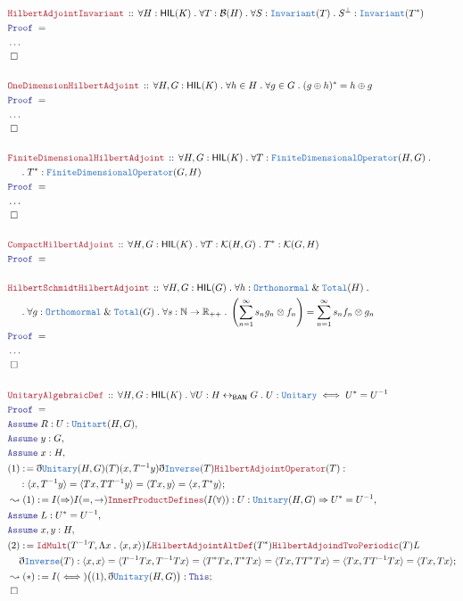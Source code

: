 \documentclass[12pt]{scrartcl}
\newcommand{\TYPE}[1]{\textcolor{NavyBlue}{\mathtt{#1}}}
\newcommand{\LOGIC}[1]{\textcolor{Blue}{\mathtt{#1}}}
\newcommand{\THM}[1]{\textcolor{Maroon}{\mathtt{#1}}}
\renewcommand{\.}{\; . \;}
\newcommand{\de}{: \kern 0.1pc =}
\newcommand{\Theorem}[2]{& \THM{#1} \, :: \, #2 \\ & \Proof = \\ }
\newcommand{\NewLine}{\\ & \kern 1pc}
\newcommand{\Page}[1]{\begin{align*} #1 \end{align*} \newpage   }
\newcommand{ \bd }{ \ByDef }
\newcommand{\NoProof}{ & \ldots \\ \EndProof}
\renewcommand{\And}{\; \& \;}
\newcommand{\Reals}{\mathbb{R} }
\newcommand{\Nat}{\mathbb{N} }
\newcommand{\ToBij}{\leftrightarrow}
\newcommand{\Conclude}[3]{& #1 \de #2 : #3; \\}
\newcommand{\Derive}[3]{& \leadsto #1 \de #2 : #3, \\}
\newcommand{\DeriveConclude}[3]{& \leadsto #1 \de #2 : #3 ; \\}
\newcommand{\A}{\LOGIC{Assume} \;}
\newcommand{\Assume}[2]{& \A #1 : #2, \\}
\newcommand{\QED}{\; \square}
\newcommand{\EndProof}{& \QED \\}
\newcommand{\ByDef}{\eth}
\newcommand{\Proof}{\LOGIC{Proof} \; }
\newcommand{\BAN}{\mathsf{BAN}} %
\newcommand{\HIL}{\mathsf{HIL}} %
\newcommand{\K}{\mathcal{K}} %
\newcommand{\B}{\mathcal{B}}
\begin{document}
\Page{
	\Theorem{HilbertAdjointInvariant}{\forall H : \HIL(K) \. \forall T : \B(H) \. 
		\forall S : \TYPE{Invariant}(T) \. S^\bot : \TYPE{Invariant}(T^*) }
	\NoProof
	\\
	\Theorem{OneDimensionHilbertAdjoint}
	{\forall H,G : \HIL(K) \. \forall h \in H \. \forall g \in G \. (g \oplus h)^* = h \oplus g}
	\NoProof
	\\
	\Theorem{FiniteDimensionalHilbertAdjoint}
	{ \forall H,G : \HIL(K) \. \forall T : \TYPE{FiniteDimensionalOperator}(H,G) \. 
	 	\NewLine \.  T^* : \TYPE{FiniteDimensionalOperator}(G,H)
	} 
	\NoProof
	\\
	\Theorem{CompactHilbertAdjoint}
	{ \forall H,G : \HIL(K) \. \forall T : \K(H,G) \. T^* : \K(G,H)
	}
	\\
	\Theorem{HilbertSchmidtHilbertAdjoint}
	{ 
	\forall H,G : \HIL(G) \. \forall  h : \TYPE{Orthonormal} \And \TYPE{Total}(H) \.
	\NewLine \.
	\forall g : \TYPE{Orthomormal} \And \TYPE{Total}(G) \.
	\forall s : \Nat \to \Reals_{++} \.
	\left(  \sum^\infty_{ n = 1} s_n g_n \otimes f_n \right) = \sum^\infty_{n = 1} s_n f_n \otimes g_n
	}
	\NoProof
	\\
	\Theorem{UnitaryAlgebraicDef}
	{
		\forall H,G : \HIL(K) \. 
		\forall U : H \ToBij_\BAN G \. 
		U : \TYPE{Unitary} \iff 
		U^* = U^{-1}  
	}
	\Assume{R}{ U : \TYPE{Unitart}(H,G)  }
	\Assume{y}{G}
	\Assume{x}{H}
	\Conclude{(1)}
	{
		\bd \TYPE{Unitary}(H,G)(T)(x,T^{-1}y)
		\bd\TYPE{Inverse}(T)
		\THM{HilbertAdjointOperator}(T)	
	}
	{ 
		\NewLine :
		\langle x, T^{-1}y \rangle = 
		\langle Tx, TT^{-1}y \rangle = 
		\langle Tx, y \rangle =
		\langle x, T^*y \rangle
	}
	\Derive{(1)}
	{
		I(\Rightarrow) 
		I(=,\to)
		\THM{InnerProductDefines}(I(\forall))
	}
	{		
		U : \TYPE{Unitary}(H,G) \Rightarrow
		U^* = U^{-1} 	
	}
	\Assume{L}{U^* = U^{-1}}
	\Assume{x,y}{H}
	\Conclude{(2)}
	{
		\THM{IdMult}(T^{-1}T, \Lambda x \. \langle x, x \rangle)
		L
		\THM{HilbertAdjointAltDef}(T^*)\THM{HilbertAdjoindTwoPeriodic}(T)
		L
		\NewLine
		\bd \TYPE{Inverse}(T)
	}
	{
		\langle x, x \rangle =
		\langle T^{-1}Tx,T^{-1}Tx \rangle =
		\langle T^*Tx, T^*Tx \rangle =
		\langle  Tx, TT^*Tx \rangle =
		\langle Tx, TT^{-1}Tx \rangle =
		\langle Tx, Tx \rangle
	}
	\DeriveConclude{(*)}
	{
		I(\iff)\big((1),\bd \TYPE{Unitary}(H,G) \big)
	}
	{
		\LOGIC{This}
	}
	\EndProof
}
\end{document}
